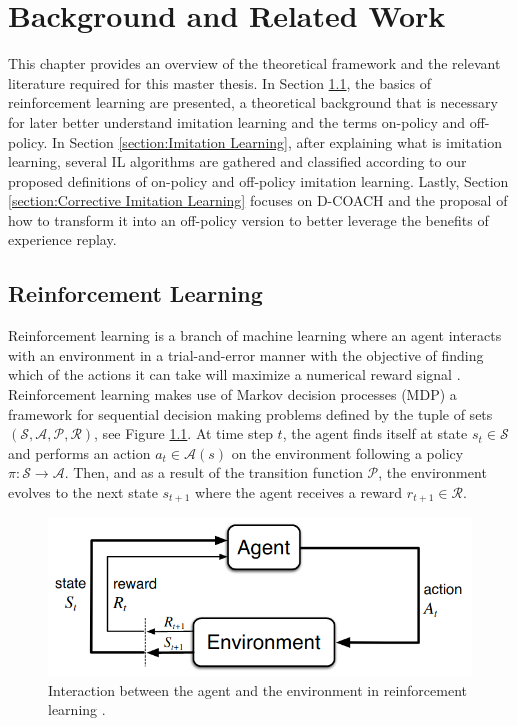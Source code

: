 \chapter{Background and Related Work}
\label{chapter:Theoretical Framework and Related Work}



This chapter provides an overview of the theoretical framework and the relevant literature required for this master thesis. In Section \ref{section:Reinforcement Learning}, the basics of reinforcement learning are presented, a theoretical background that is necessary for later better understand imitation learning and the terms on-policy and off-policy. In Section \ref{section:Imitation Learning}, after explaining what is imitation learning, several IL algorithms are gathered and classified according to our proposed definitions of on-policy and off-policy imitation learning. Lastly, Section \ref{section:Corrective Imitation Learning} focuses on D-COACH and the proposal of how to transform it into an off-policy version to better leverage the benefits of experience replay.




\section{Reinforcement Learning}
\label{section:Reinforcement Learning}

Reinforcement learning is a branch of machine learning where an agent interacts with an environment in a trial-and-error manner with the objective of finding which of the actions it can take will maximize a numerical reward signal \cite{Sutton:1998}. Reinforcement learning makes use of Markov decision processes (MDP) a framework for sequential decision making problems defined by the tuple of sets $(\mathcal{S}, \mathcal{A}, \mathcal{P}, \mathcal{R})$, see Figure \ref{fig:reinforcement_learning}. At time step $t$, the agent finds itself at state $s_t \in \mathcal{S}$ and performs an action $a_t \in \mathcal{A}(s)$ on the environment following a policy $\pi: \mathcal{S} \rightarrow \mathcal{A}$. Then, and as a result of the transition function $\mathcal{P}$, the environment evolves to the next state $s_{t+1}$ where the agent receives a reward $r_{t+1} \in \mathcal{R}$. 

\begin{figure}[H]
    \centering
    \includegraphics[width=.7\textwidth]{figures/reinforcement_learning.png}
    \caption{Interaction between the agent and the environment in reinforcement learning \cite{Sutton:1998}.}
    \label{fig:reinforcement_learning}
\end{figure}

